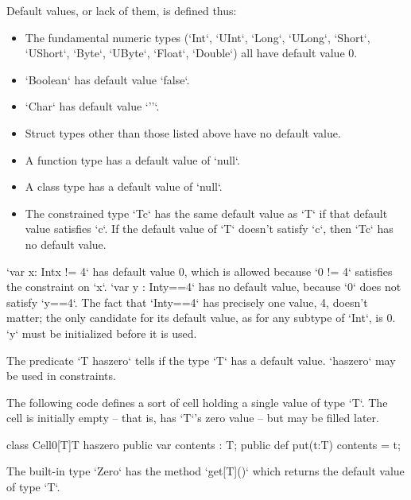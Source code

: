 Default values, or lack of them, is defined thus:
\begin{itemize}
\item The fundamental numeric types (\xcd`Int`, \xcd`UInt`,
      \xcd`Long`, \xcd`ULong`, 
  \xcd`Short`, \xcd`UShort`, \xcd`Byte`,
   \xcd`UByte`, 
      \xcd`Float`, \xcd`Double`) all have default value 0.
\item \xcd`Boolean` has default value \xcd`false`.
\item \xcd`Char` has default value \xcd`'\0'`.
\item Struct types other than those listed above have no default value.
\item A function type has a default value of \xcd`null`.
\item A class type has a default value of \xcd`null`.
\item The constrained type \xcd`T{c}` has the same default value as \xcd`T` if
      that default value satisfies \xcd`c`.  If the default value of \xcd`T`
      doesn't satisfy \xcd`c`, then \xcd`T{c}` has no default value.
\end{itemize}

\begin{ex}
\xcd`var x: Int{x != 4}` has default value 0, which is allowed
because \xcd`0 != 4` satisfies the constraint on \xcd`x`. 
\xcd`var y : Int{y==4}` has no default value, because \xcd`0` does not satisfy \xcd`y==4`.
The fact that \xcd`Int{y==4}` has precisely one value, \viz{} 4, doesn't
matter; the only candidate for its default value, as for any subtype of
\xcd`Int`, is 0. \xcd`y` must be initialized before it is used.
\end{ex}

The predicate \xcd`T haszero` tells if the type \xcd`T` has a default value.
\xcd`haszero` may be used in constraints. 

\begin{ex}
The following code defines a sort of cell holding a single value of type
\xcd`T`. The cell is initially empty -- that is, has \xcd`T`'s zero value --
but may be filled later. 
\begin{xten}
class Cell0[T]{T haszero} {
  public var contents : T;
  public def put(t:T) { contents = t; }
}
\end{xten}
%
\end{ex}

The built-in type \xcd`Zero` has the method \xcd`get[T]()` which
returns the default value of type \xcd`T`.  

